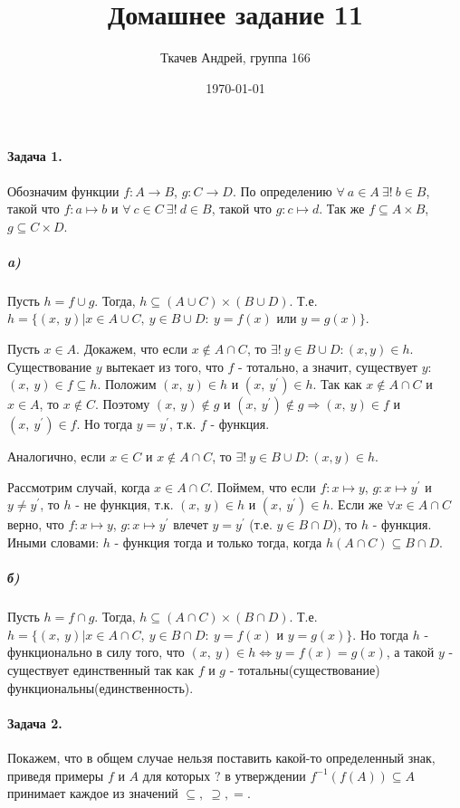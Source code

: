 \documentclass{article}
\title{Домашнее задание 11}
\author{Ткачев Андрей, группа 166}
\date{\today}
\begin{document}
	\maketitle
	\paragraph{Задача 1.}
		Обозначим функции $f: A \rightarrow B$, $g: C \rightarrow D$. По определению $\forall\ a \in A\ \exists!\ b \in B$, такой что $f: a \mapsto b$ и $\forall\ c \in C\ \exists!\ d \in B$, такой что $g: c \mapsto d$. Так же $f \subseteq A \times B$, $g \subseteq C \times D$.
		
		\subparagraph{a)} Пусть $h = f \cup g$. Тогда, $h \subseteq (A \cup C) \times (B \cup D)$. Т.е. $h = \{(x,\ y)| x \in A \cup C,\ y \in B \cup D:\ y=f(x)$ или $y=g(x)\}$. 
		
		Пусть $x \in A$. Докажем, что если $x \notin A \cap C$, то $\exists!\ y\in B \cup D: (x, y) \in h$. Существование $y$ вытекает из того, что $f$ - тотально, а значит, существует $y$: $(x,\ y) \in f \subseteq h$. Положим $(x,\ y) \in h$ и $(x,\ y^{\prime}) \in h$. Так как $x \notin A \cap C$ и $x \in A$, то $x \notin C$. Поэтому $(x,\ y) \notin g$ и $(x,\ y^{\prime}) \notin g \Rightarrow (x,\ y) \in f$ и $(x,\ y^{\prime}) \in f$. Но тогда $y = y^{\prime}$, т.к. $f$ - функция.
		
		Аналогично, если $x \in C$ и $x \notin A \cap C$, то $\exists!\ y\in B \cup D: (x, y) \in h$. 
		
		Рассмотрим случай, когда $x \in A \cap C$. Поймем, что если $f: x \mapsto y$, $g: x \mapsto y^{\prime}$ и $y \ne y^{\prime}$, то $h$ - не функция, т.к. $(x,\ y) \in h$ и $(x,\ y^{\prime}) \in h$. Если же $\forall x \in A \cap C$ верно, что $f: x \mapsto y$, $g: x \mapsto y^{\prime}$ влечет $y = y^{\prime}$ (т.е. $y \in B \cap D$), то $h$ - функция. Иными словами: $h$ - функция тогда и только тогда, когда $h( A \cap C) \subseteq B\cap D$. 
		
		\subparagraph{б)}  Пусть $h = f \cap g$. Тогда, $h \subseteq (A \cap C) \times (B \cap D)$. Т.е. $h = \{(x,\ y)| x \in A \cap C,\ y \in B \cap D:\ y=f(x)$ и $y=g(x)\}$. Но тогда $h$ - функционально в силу того, что $(x,\ y) \in h \Leftrightarrow y=f(x)=g(x)$, а такой $y$ - существует единственный так как $f$ и $g$ - тотальны(существование) функциональны(единственность).
		
	\paragraph{Задача 2.}
		Покажем, что в общем случае нельзя поставить какой-то определенный знак, приведя примеры $f$ и $A$ для которых $?$ в утверждении $f^{-1}(f(A)) \subseteq A$ принимает каждое из значений $\subseteq,\ \supseteq, =$.
		
\end{document}
